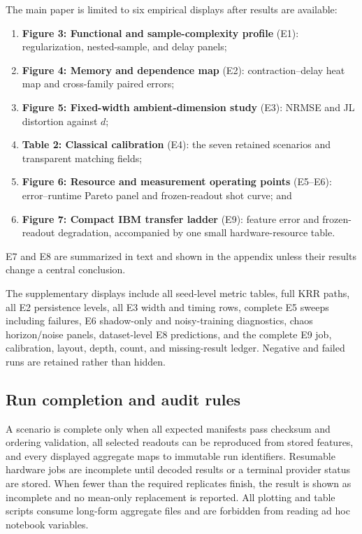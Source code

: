 The main paper is limited to six empirical displays after results are available:
\begin{enumerate}
  \item \textbf{Figure 3: Functional and sample-complexity profile} (E1):
        regularization, nested-sample, and delay panels;
  \item \textbf{Figure 4: Memory and dependence map} (E2): contraction--delay
        heat map and cross-family paired errors;
  \item \textbf{Figure 5: Fixed-width ambient-dimension study} (E3): NRMSE and
        JL distortion against \(d\);
  \item \textbf{Table 2: Classical calibration} (E4): the seven retained
        scenarios and transparent matching fields;
  \item \textbf{Figure 6: Resource and measurement operating points} (E5--E6):
        error--runtime Pareto panel and frozen-readout shot curve; and
  \item \textbf{Figure 7: Compact IBM transfer ladder} (E9): feature error and
        frozen-readout degradation, accompanied by one small hardware-resource
        table.
\end{enumerate}
E7 and E8 are summarized in text and shown in the appendix unless their results
change a central conclusion.

The supplementary displays include all seed-level metric tables, full KRR
paths, all E2 persistence levels, all E3 width and timing rows, complete E5
sweeps including failures, E6 shadow-only and noisy-training diagnostics,
chaos horizon/noise panels, dataset-level E8 predictions, and the complete E9
job, calibration, layout, depth, count, and missing-result ledger.  Negative
and failed runs are retained rather than hidden.

\subsection{Run completion and audit rules}
\label{app:completion-rules}

A scenario is complete only when all expected manifests pass checksum and
ordering validation, all selected readouts can be reproduced from stored
features, and every displayed aggregate maps to immutable run identifiers.
Resumable hardware jobs are incomplete until decoded results or a terminal
provider status are stored.  When fewer than the required replicates finish,
the result is shown as incomplete and no mean-only replacement is reported.
All plotting and table scripts consume long-form aggregate files and are
forbidden from reading ad hoc notebook variables.
